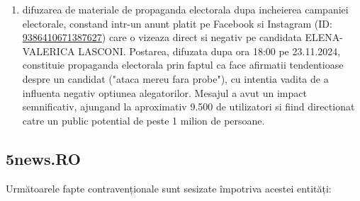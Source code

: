 \documentclass[a4paper,12pt]{article}
\begin{document}
\begin{enumerate}[leftmargin=*, label=\arabic*.)]
    \item difuzarea de materiale de propaganda electorala dupa incheierea campaniei electorale, constand intr-un anunt platit pe Facebook si Instagram (ID: \href{https://www.facebook.com/ads/library/?id=9386410671387627}{9386410671387627}) care o vizeaza direct si negativ pe candidata ELENA-VALERICA LASCONI. Postarea, difuzata dupa ora 18:00 pe 23.11.2024, constituie propaganda electorala prin faptul ca face afirmatii tendentioase despre un candidat ("ataca mereu fara probe"), cu intentia vadita de a influenta negativ optiunea alegatorilor. Mesajul a avut un impact semnificativ, ajungand la aproximativ 9.500 de utilizatori si fiind directionat catre un public potential de peste 1 milion de persoane.
\end{enumerate}

\vspace{0.5cm}

\subsection{5news.RO}
Următoarele fapte contravenționale sunt sesizate împotriva acestei entități:
\end{document}
